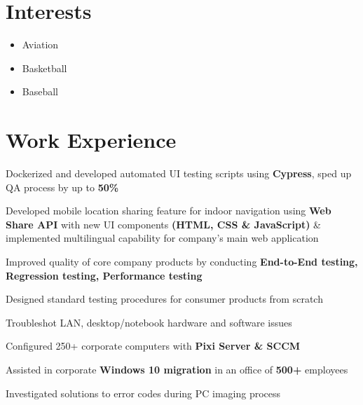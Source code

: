 \documentclass[]{morris-cv}
\begin{document}
\begin{minipage}[t]{0.25\textwidth}
\section {Interests}
\begin{itemize}
    \setlength\itemsep{-0.2em}
        \item Aviation
        \item Basketball
        \item Baseball
\end{itemize}
\sectionsep

%
%

\end{minipage} 
\hfill
\begin{minipage}[t]{0.67\textwidth} 


\section{Work Experience}
\vspace{\topsep} %
\begin{tightemize}
    \item Dockerized and developed automated UI testing scripts using \textbf{Cypress},
    sped up QA process by up to \textbf{50\%}
    \item Developed mobile location sharing feature for indoor navigation using \textbf{Web Share API} with new UI components \textbf{(HTML, CSS \& JavaScript)} \& implemented multilingual capability for company's main web application
    \item Improved quality of core company products by conducting \textbf{End-to-End testing, Regression testing, Performance testing}
    \item Designed standard testing procedures for consumer products from scratch
\end{tightemize}
\sectionsep

\begin{tightemize}
    \item Troubleshot LAN, desktop/notebook hardware and software issues
    \item Configured 250+ corporate computers with \textbf{Pixi Server \& SCCM}
    \item Assisted in corporate \textbf{Windows 10 migration} in an office of \textbf{500+} employees
    \item Investigated solutions to error codes during PC imaging process
\end{tightemize}
\sectionsep


\end{minipage}
\end{document}
